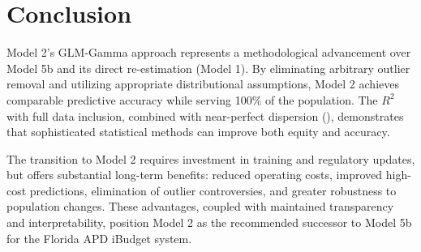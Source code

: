 \section{Conclusion}

Model 2's GLM-Gamma approach represents a methodological advancement over Model 5b and its direct re-estimation (Model 1). By eliminating arbitrary outlier removal and utilizing appropriate distributional assumptions, Model 2 achieves comparable predictive accuracy while serving 100\% of the population. The \ModelTwoRSquaredTest{} $R^2$ with full data inclusion, combined with near-perfect dispersion (\ModelTwoDispersion), demonstrates that sophisticated statistical methods can improve both equity and accuracy.

The transition to Model 2 requires investment in training and regulatory updates, but offers substantial long-term benefits: reduced operating costs, improved high-cost predictions, elimination of outlier controversies, and greater robustness to population changes. These advantages, coupled with maintained transparency and interpretability, position Model 2 as the recommended successor to Model 5b for the Florida APD iBudget system.